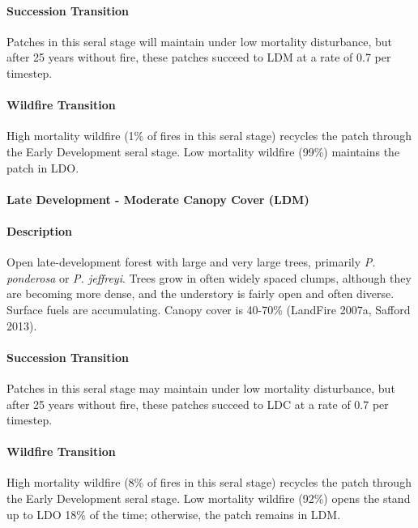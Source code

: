 \paragraph{Succession Transition} Patches in this seral stage will maintain under low mortality disturbance, but after 25 years without fire, these patches succeed to LDM at a rate of 0.7 per timestep.

\paragraph{Wildfire Transition} High mortality wildfire (1\% of fires in this seral stage) recycles the patch through the Early Development seral stage. Low mortality wildfire (99\%) maintains the patch in LDO.

\noindent\hrulefill

\paragraph{Late Development - Moderate Canopy Cover (LDM)}

\paragraph{Description} Open late-development forest with large and very large trees, primarily \emph{P. ponderosa} or \emph{P. jeffreyi}. Trees grow in often widely spaced clumps, although they are becoming more dense, and the understory is fairly open and often diverse. Surface fuels are accumulating. Canopy cover is 40-70\% (LandFire 2007a, Safford 2013).

\paragraph{Succession Transition} Patches in this seral stage may maintain under low mortality disturbance, but after 25 years without fire, these patches succeed to LDC at a rate of 0.7 per timestep.

\paragraph{Wildfire Transition} High mortality wildfire (8\% of fires in this seral stage) recycles the patch through the Early Development seral stage. Low mortality wildfire (92\%) opens the stand up to LDO 18\% of the time; otherwise, the patch remains in LDM.

\noindent\hrulefill

